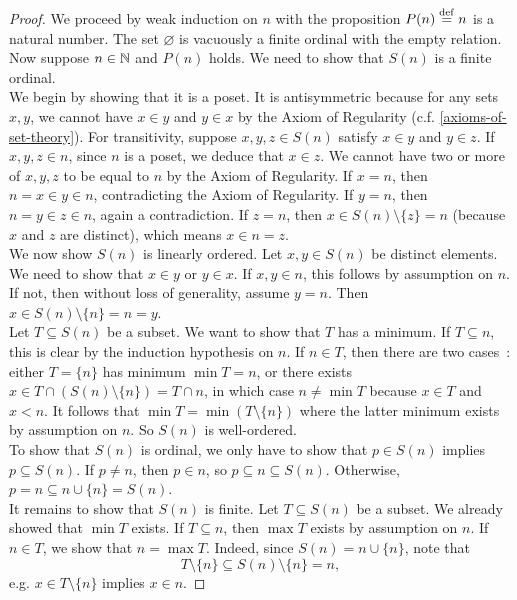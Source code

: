 \begin{proof}
    We proceed by weak induction on $n$ with the proposition $P(n) \overset{\mathrm{def}}{=} n$ is a natural number. The set $\varnothing$ is vacuously a finite ordinal with the empty relation. Now suppose $n \in \operatorname{\mathbb N}$ and $P(n)$ holds. We need to show that $S(n)$ is a finite ordinal. 
    \\

    We begin by showing that it is a poset. It is antisymmetric because for any sets $x,y$, we cannot have $x \in y$ and $y \in x$ by the Axiom of Regularity (c.f. \autoref{axioms-of-set-theory}). For transitivity, suppose $x,y,z \in S(n)$ satisfy $x \in y$ and $y \in z$. If $x,y,z \in n$, since $n$ is a poset, we deduce that $x \in z$. We cannot have two or more of $x,y,z$ to be equal to $n$ by the Axiom of Regularity. If $x = n$, then $n = x \in y \in n$, contradicting the Axiom of Regularity. If $y = n$, then $n = y \in z \in n$, again a contradiction. If $z = n$, then $x \in S(n) \setminus \{z\} = n$ (because $x$ and $z$ are distinct), which means $x \in n = z$.
    \\

    We now show $S(n)$ is linearly ordered. Let $x,y \in S(n)$ be distinct elements. We need to show that $x \in y$ or $y \in x$. If $x,y \in n$, this follows by assumption on $n$. If not, then without loss of generality, assume $y = n$. Then $x \in S(n) \setminus \{n\} = n = y$.
    \\

    Let $T \subseteq S(n)$ be a subset. We want to show that $T$ has a minimum. If $T \subseteq n$, this is clear by the induction hypothesis on $n$. If $n \in T$, then there are two cases~: either $T = \{n\}$ has minimum $\min T = n$, or there exists $x \in T \cap (S(n) \setminus \{n\}) = T \cap n$, in which case $n \neq \min T$ because $x \in T$ and $x < n$. It follows that $\min T = \min(T \setminus \{n\})$ where the latter minimum exists by assumption on $n$. So $S(n)$ is well-ordered.
    \\

    To show that $S(n)$ is ordinal, we only have to show that $p \in S(n)$ implies $p \subseteq S(n)$. If $p \neq n$, then $p \in n$, so $p \subseteq n \subseteq S(n)$. Otherwise, $p = n \subseteq n \cup \{n\} = S(n)$. 
    \\

    It remains to show that $S(n)$ is finite. Let $T \subseteq S(n)$ be a subset. We already showed that $\min T$ exists. If $T \subseteq n$, then $\max T$ exists by assumption on $n$. If $n \in T$, we show that $n = \max T$. Indeed, since $S(n) = n \cup \{n\}$, note that
    \[
        T \setminus \{n\} \subseteq S(n) \setminus \{n\} = n,
    \]
    e.g. $x \in T \setminus \{n\}$ implies $x \in n$.
\end{proof}

